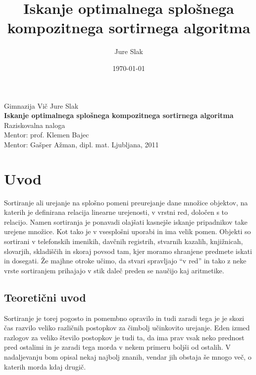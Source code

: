 \documentclass[a4paper,oneside]{article}
\title{Iskanje optimalnega splošnega kompozitnega sortirnega algoritma}
\author{Jure Slak}
\date{\today}
\begin{document}
\addto\captionsslovene {
\renewcommand\bibname{}
}
\renewcommand\refname{}


\thispagestyle{empty}

\begin{center}{\large
  Gimnazija Vič
  \vfill
  Jure Slak\\[2mm]
  {\bf Iskanje optimalnega splošnega kompozitnega sortirnega algoritma}\\[10mm]
  Raziskovalna naloga\\[1cm]
  Mentor: prof. Klemen Bajec \\[2mm]
  Mentor: Gašper Ažman, dipl. mat.}
  \vfill
  \vfill
  \large Ljubljana, 2011
\end{center}
\pagebreak

\thispagestyle{empty}
\tableofcontents
\pagebreak

\section{Uvod}
\label{chapter:uvod}

Sortiranje ali urejanje na splošno pomeni preurejanje dane množice objektov, na katerih
je definirana relacija linearne urejenosti, v vrstni red, določen s to relacijo.
Namen sortiranja je ponavadi olajšati kasnejše iskanje pripadnikov take urejene množice. Kot tako je
v vsesplošni uporabi in ima velik pomen. Objekti so sortirani v telefonskih imenikih,
davčnih registrih, stvarnih kazalih, knjižnicah, slovarjih, skladiščih in skoraj povsod tam,
kjer moramo shranjene predmete iskati in dosegati. Že majhne otroke učimo, da stvari spravljajo
``v red'' in tako z neke vrste sortiranjem prihajajo v stik daleč preden se naučijo kaj
aritmetike.

\subsection{Teoretični uvod}
\label{chapter:teoreticni}
Sortiranje je torej pogosto in pomembno opravilo in tudi zaradi tega je je skozi čas
razvilo veliko različnih postopkov za čimbolj učinkovito urejanje. Eden izmed razlogov za
veliko število postopkov je tudi ta, da ima prav vsak neko prednost pred ostalimi in je
zaradi tega morda v nekem primeru boljši od ostalih. V nadaljevanju bom opisal nekaj najbolj znanih, 
vendar jih obstaja še mnogo več, o katerih morda kdaj drugič. 
\end{document}
